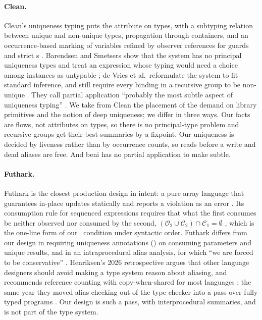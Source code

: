 \paragraph{Clean.} Clean's uniqueness typing puts the attribute \code{*} on types, with a subtyping
relation between unique and non-unique types, propagation through containers, and an occurrence-based
marking of variables refined by observer references for guards and strict s
\citep{smetsers1994guaranteeing,barendsen1993conventional,barendsen1996uniqueness,plasmeijer2011clean}.
Barendsen and Smetsers show that the system has no principal uniqueness types and treat an expression
whose typing would need a choice among instances as untypable \citep[\S8]{barendsen1996uniqueness}; de
Vries et al.\ reformulate the system to fit standard inference, and still require every binding in a
recursive group to be non-unique \citep{devries2007redefined,devries2008simplified}. They call partial
application ``probably the most subtle aspect of uniqueness typing'' \citep[\S4.2]{devries2008simplified}.
We take from Clean the placement of the demand on library primitives and the notion of deep uniqueness;
we differ in three ways. Our facts are flows, not attributes on types, so there is no principal-type
problem and recursive groups get their best summaries by a fixpoint. Our uniqueness is decided by
liveness rather than by occurrence counts, so reads before a write and dead aliases are free. And beni has
no partial application to make subtle.

\paragraph{Futhark.} Futhark is the closest production design in intent: a pure array language that
guarantees in-place updates statically and reports a violation as an error
\citep{henriksen2017futhark,henriksen2017thesis}. Its consumption rule for sequenced expressions
requires that what the first consumes be neither observed nor consumed by the second,
$(\mathcal{O}_2 \cup \mathcal{C}_2) \cap \mathcal{C}_1 = \emptyset$
\citep[Fig.~5, \textsc{Occurence-Seq}]{henriksen2017futhark}, which is the one-line form of our \Dead\
condition under syntactic order. Futhark differs from our design in requiring uniqueness annotations
(\code{*}) on consuming parameters and unique results, and in an intraprocedural alias analysis, for which
``we are forced to be conservative'' \citep[\S3.2]{henriksen2017futhark}. Henriksen's 2026 retrospective
argues that other language designers should avoid making a type system reason about aliasing, and
recommends reference counting with copy-when-shared for most languages \citep{henriksen2026aliasing}; the
same year they moved alias checking out of the type checker into a pass over fully typed programs
\citep{henriksen2026rewrite}. Our design is such a pass, with interprocedural summaries, and is not part of
the type system.

